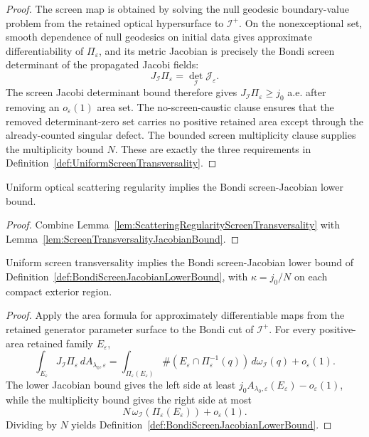 \begin{proof}
The screen map is obtained by solving the null geodesic boundary-value problem from the retained optical hypersurface to $\mathscr I^+$. On the nonexceptional set, smooth dependence of null geodesics on initial data gives approximate differentiability of $\Pi_\varepsilon$, and its metric Jacobian is precisely the Bondi screen determinant of the propagated Jacobi fields:
\[
    J_{\mathscr I}\Pi_\varepsilon=\det_{\mathscr I}\mathcal J_\varepsilon .
\]
The screen Jacobi determinant bound therefore gives $J_{\mathscr I}\Pi_\varepsilon\ge j_0$ a.e. after removing an $o_\varepsilon(1)$ area set. The no-screen-caustic clause ensures that the removed determinant-zero set carries no positive retained area except through the already-counted singular defect. The bounded screen multiplicity clause supplies the multiplicity bound $N$. These are exactly the three requirements in Definition~\ref{def:UniformScreenTransversality}.
\end{proof}

\begin{corollary}\label{cor:ScatteringRouteBondiScreen}
Uniform optical scattering regularity implies the Bondi screen-Jacobian lower bound.
\end{corollary}

\begin{proof}
Combine Lemma~\ref{lem:ScatteringRegularityScreenTransversality} with Lemma~\ref{lem:ScreenTransversalityJacobianBound}.
\end{proof}

\begin{lemma}\label{lem:ScreenTransversalityJacobianBound}
Uniform screen transversality implies the Bondi screen-Jacobian lower bound of Definition~\ref{def:BondiScreenJacobianLowerBound}, with $\kappa=j_0/N$ on each compact exterior region.
\end{lemma}

\begin{proof}
Apply the area formula for approximately differentiable maps from the retained generator parameter surface to the Bondi cut of $\mathscr I^+$. For every positive-area retained family $E_\varepsilon$,
\[
    \int_{E_\varepsilon}J_{\mathscr I}\Pi_\varepsilon\,dA_{\lambda_0,\varepsilon}
    =
    \int_{\Pi_\varepsilon(E_\varepsilon)}
    \#(E_\varepsilon\cap\Pi_\varepsilon^{-1}(q))\,d\omega_{\mathscr I}(q)
    +o_\varepsilon(1).
\]
The lower Jacobian bound gives the left side at least $j_0A_{\lambda_0,\varepsilon}(E_\varepsilon)-o_\varepsilon(1)$, while the multiplicity bound gives the right side at most
\[
    N\,\omega_{\mathscr I}(\Pi_\varepsilon(E_\varepsilon))+o_\varepsilon(1).
\]
Dividing by $N$ yields Definition~\ref{def:BondiScreenJacobianLowerBound}.
\end{proof}

